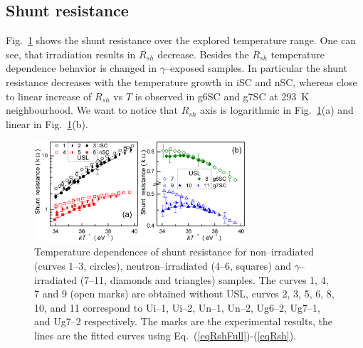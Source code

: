 \documentclass[aip,jap, amsmath,amssymb,reprint]{revtex4-1}
\begin{document}
\subsection{Shunt resistance\label{Rsh}}
Fig.~\ref{fig_Rsh} shows the  shunt resistance  over the explored temperature range.
One can see, that irradiation results in $R_{sh}$ decrease.
Besides the $R_{sh}$ temperature dependence behavior is changed in $\gamma$--exposed samples.
In particular  the shunt resistance decreases with the temperature growth in iSC and nSC,
whereas close to linear increase of $R_{sh}$ vs $T$  is observed in g6SC and g7SC at 293~K neighbourhood.
We want to notice that $R_{sh}$ axis is logarithmic in Fig.~\ref{fig_Rsh}(a) and linear in Fig.~\ref{fig_Rsh}(b).

\begin{figure}
\includegraphics[width=0.7\textwidth]{fig_9ab}%
\caption{\label{fig_Rsh}
Temperature dependences of shunt resistance for non--irradiated (curves 1--3, circles),
neutron--irradiated (4--6, squares) and $\gamma$--irradiated (7--11, diamonds and triangles) samples.
The curves 1, 4, 7 and 9 (open marks) are obtained without USL,
curves 2, 3, 5, 6, 8, 10, and 11 correspond to
Ui--1, Ui--2, Un--1, Un--2, Ug6--2, Ug7--1, and Ug7--2 respectively.
The marks are the experimental results, the lines are the fitted curves using Eq.~(\ref{eqRshFull})-(\ref{eqRsh}).
}%
\end{figure}
\end{document}
